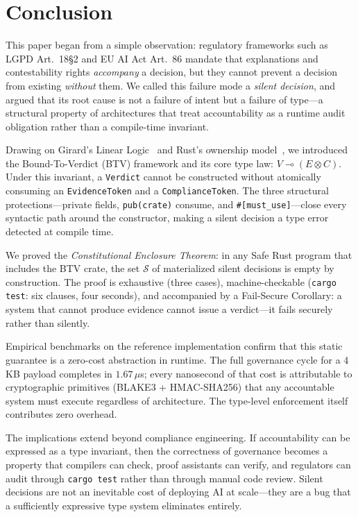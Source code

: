 
\section{Conclusion}
\label{sec:conclusion}

This paper began from a simple observation: regulatory frameworks
such as LGPD Art.~18\S2 and EU AI Act Art.~86 mandate that
explanations and contestability rights \emph{accompany} a decision,
but they cannot prevent a decision from existing \emph{without} them.
We called this failure mode a \emph{silent decision}, and argued
that its root cause is not a failure of intent but a failure of
type---a structural property of architectures that treat
accountability as a runtime audit obligation rather than a
compile-time invariant.

Drawing on Girard's Linear Logic~\cite{girard1987linear} and Rust's
ownership model~\cite{jung2017rustbelt}, we introduced the
Bound-To-Verdict (BTV) framework and its core type law:
$V \multimap (E \otimes C)$.
Under this invariant, a \texttt{Verdict} cannot be constructed
without atomically consuming an \texttt{EvidenceToken} and a
\texttt{ComplianceToken}.
The three structural protections---private fields, \texttt{pub(crate)}
consume, and \texttt{\#[must\_use]}---close every syntactic path
around the constructor, making a silent decision a type error
detected at compile time.

We proved the \emph{Constitutional Enclosure Theorem}: in any Safe
Rust program that includes the BTV crate, the set $\mathcal{S}$ of
materialized silent decisions is empty by construction.
The proof is exhaustive (three cases), machine-checkable
(\texttt{cargo test}: six clauses, four seconds), and accompanied
by a Fail-Secure Corollary: a system that cannot produce evidence
cannot issue a verdict---it fails securely rather than silently.

Empirical benchmarks on the reference implementation confirm that
this static guarantee is a zero-cost abstraction in runtime.
The full governance cycle for a 4\,KB payload completes in
$1.67\,\mu$s; every nanosecond of that cost is attributable to
cryptographic primitives (BLAKE3 + HMAC-SHA256) that any
accountable system must execute regardless of architecture.
The type-level enforcement itself contributes zero overhead.

The implications extend beyond compliance engineering.
If accountability can be expressed as a type invariant, then
the correctness of governance becomes a property that compilers
can check, proof assistants can verify, and regulators can audit
through \texttt{cargo test} rather than through manual code
review.
Silent decisions are not an inevitable cost of deploying AI at
scale---they are a bug that a sufficiently expressive type system
eliminates entirely.

